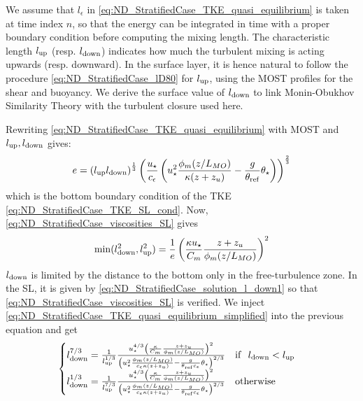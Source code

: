 We assume that $l_\epsilon$ in
\eqref{eq:ND_StratifiedCase_TKE_quasi_equilibrium} is taken at
time index $n$, so that the energy can be integrated in time
with a proper boundary condition before computing the mixing
length. The characteristic length $l_{\rm up}$ (resp. $l_{\rm down}$) indicates
how much the turbulent mixing is acting upwards (resp. downward).
In the surface layer, it is hence natural to follow the
procedure \eqref{eq:ND_StratifiedCase_lD80} for $l_{\rm up}$,
using the MOST profiles for the shear and buoyancy.
We derive the surface value of $l_{\rm down}$ to link Monin-Obukhov
Similarity Theory with the turbulent closure used here.
\par
Rewriting \eqref{eq:ND_StratifiedCase_TKE_quasi_equilibrium}
with MOST and $l_{\rm up}, l_{\rm down}$ gives:
\begin{equation}
	\label{eq:ND_StratifiedCase_TKE_quasi_equilibrium_simplified}
	e = \left(l_{\rm up} l_{\rm down}\right)^\frac{1}{3}\left(
	\frac{u_\star}{c_\epsilon} 
	\left({u}_\star^2
	\frac{\phi_m(z/L_{MO})}{\kappa (z+z_{u})}
	- \frac{g}{\theta_{\rm ref}}\theta_\star
	\right)
	\right)^\frac{2}{3}
\end{equation}
which is the bottom boundary condition of the TKE
\eqref{eq:ND_StratifiedCase_TKE_SL_cond}.
Now, \eqref{eq:ND_StratifiedCase_viscosities_SL} gives
\begin{equation}
	\label{eq:ND_StratifiedCase_solution_l_down1}
	\min (l_{\rm down}^2, l_{\rm up}^2) = \frac{1}{e} \left(
	\frac{\kappa u_\star}{C_m}
	\frac{z + z_{u}}{\phi_m(z/L_{MO})}
\right)^2
\end{equation}
$l_{\rm down}$ is limited by the distance to the bottom only
in the free-turbulence zone. In the SL, it is given by
\eqref{eq:ND_StratifiedCase_solution_l_down1}
so that \eqref{eq:ND_StratifiedCase_viscosities_SL} is
verified.
We inject \eqref{eq:ND_StratifiedCase_TKE_quasi_equilibrium_simplified}
into the previous equation and get
\begin{equation}
	\label{eq:ND_StratifiedCase_solution_l_down2}
	\begin{cases}
	l_{\rm down}^{7/3} = \frac{1}{l_{\rm up}^{1/3}}
		\frac{u_\star^{4/3}\left(
	\frac{\kappa}{C_m}
	\frac{z + z_{u}}{\phi_m(z/L_{MO})}
	\right)^2}{
	\left({u}_\star^2
	\frac{\phi_m(z/L_{MO})}{c_\epsilon\kappa (z+z_{u})}
	- \frac{g}{\theta_{\rm ref}c_\epsilon}\theta_\star
	\right)^{2/3}} ~~~ {\rm if } ~~l_{\rm down} < l_{\rm up}\\
	l_{\rm down}^{1/3} = \frac{1}{l_{\rm up}^{7/3}}
		\frac{u_\star^{4/3}\left(
	\frac{\kappa}{C_m}
	\frac{z + z_{u}}{\phi_m(z/L_{MO})}
	\right)^2}{
	\left({u}_\star^2
	\frac{\phi_m(z/L_{MO})}{c_\epsilon\kappa (z+z_{u})}
	- \frac{g}{\theta_{\rm ref}c_\epsilon}\theta_\star
	\right)^{2/3}} ~~~ {\rm otherwise}\\
	\end{cases}
\end{equation}
